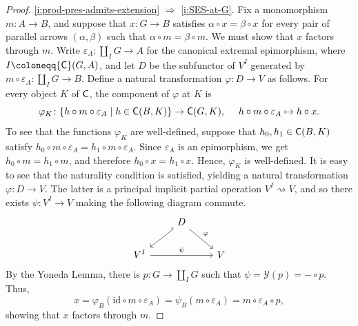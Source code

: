 \documentclass[a4paper,10pt,reqno]{amsart}
\theoremstyle{definition}
\theoremstyle{remark}
\renewcommand{\phi}{\varphi}
\renewcommand{\epsilon}{\varepsilon}
\newcommand{\cat}{{\sf C}}								%
\newcommand{\yo}{\mathcal{Y}}
\newcommand{\id}{\mathrm{id}}								%
\newcommand{\IMP}{\Rightarrow}						%
\begin{document}
\begin{proof}
\ref{i:prod-pres-admits-extension} $\IMP$ \ref{i:SES-at-G}. Fix a monomorphism $m\colon A\to B$, and suppose that $x\colon G\to B$ satisfies $\alpha\circ x = \beta\circ x$ for every pair of parallel arrows $(\alpha,\beta)$ such that $\alpha\circ m = \beta\circ m$. We must show that $x$ factors through $m$. 
%
Write $\epsilon_{A}\colon \coprod_{I}{G}\to A$ for the canonical extremal epimorphism, where $I\coloneqq \cat(G,A)$, and let $D$ be the subfunctor of $V^{I}$ generated by $m\circ \epsilon_{A}\colon \coprod_{I}{G}\to B$. Define a natural transformation $\phi\colon D\to V$ as follows. For every object $K$ of $\cat$, the component of $\phi$ at $K$ is
\[
\phi_{K}\colon \{h\circ m\circ \epsilon_{A}\mid h\in \cat(B,K)\} \to \cat(G,K), \ \ \ \ h\circ m\circ \epsilon_{A}\mapsto h\circ x.
\]
To see that the functions $\phi_{K}$ are well-defined, suppose that $h_{0},h_{1}\in \cat(B,K)$ satisfy $h_{0}\circ m\circ \epsilon_{A}=h_{1}\circ m\circ \epsilon_{A}$. Since $\epsilon_{A}$ is an epimorphism, we get $h_{0}\circ m=h_{1}\circ m$, and therefore $h_{0}\circ x=h_{1}\circ x$. Hence, $\phi_{K}$ is well-defined. It is easy to see that the naturality condition is satisfied, yielding a natural transformation $\phi\colon D\to V$. The latter is a principal implicit partial operation $V^{I}\rightsquigarrow V$, and so there exists $\psi\colon V^{I}\to V$ making the following diagram commute.
\[\begin{tikzcd}
& D \arrow{dr}{\phi} & \\
V^{I} \arrow{rr}{\psi} \arrow[hookleftarrow]{ur} & & V
\end{tikzcd}\]
%
By the Yoneda Lemma, there is $p\colon G\to \coprod_{I}G$ such that $\psi=\yo(p)=-\circ p$. Thus,
\[
x = \phi_{B}(\id\circ m\circ \epsilon_{A}) = \psi_{B}(m\circ \epsilon_{A}) = m\circ \epsilon_{A}\circ p,
\]
showing that $x$ factors through $m$. 


\end{proof}
\end{document}
